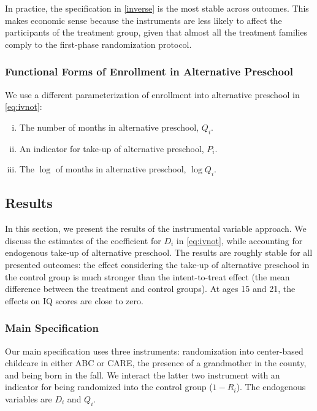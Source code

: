 \begin{appendices}
\noindent In practice, the specification in \eqref{inverse} is the most stable across outcomes. This makes economic sense because the instruments are less likely to affect the participants of the treatment group, given that almost all the treatment families comply to the first-phase randomization protocol.

\subsubsection{Functional Forms of Enrollment in Alternative Preschool}

\noindent We use a different parameterization of enrollment into alternative preschool in \eqref{eq:ivnot}: 

\begin{enumerate}[(i)]
\item The number of months in alternative preschool, $Q_{i}$.
\item An indicator for take-up of alternative preschool, $P_i$.
\item The $\log$ of months in alternative preschool, $\log Q_{i}$.
\end{enumerate}

\subsection{Results}

\noindent In this section, we present the results of the instrumental variable approach. We discuss the estimates of the coefficient for $D_{i}$ in \eqref{eq:ivnot}, while accounting for endogenous take-up of alternative preschool. The results are roughly stable for all presented outcomes: the effect considering the take-up of alternative preschool in the control group is much stronger than the intent-to-treat effect (the mean difference between the treatment and control groups). At ages 15 and 21, the effects on IQ scores are close to zero.

\subsubsection{Main Specification}

\noindent Our main specification uses three instruments: randomization into center-based childcare in either ABC or CARE, the presence of a grandmother in the county, and being born in the fall. We interact the latter two instrument with an indicator for being randomized into the control group ($1-R_{i}$). The endogenous variables are $D_{i}$ and $Q_{i}$.\\


\end{appendices}
